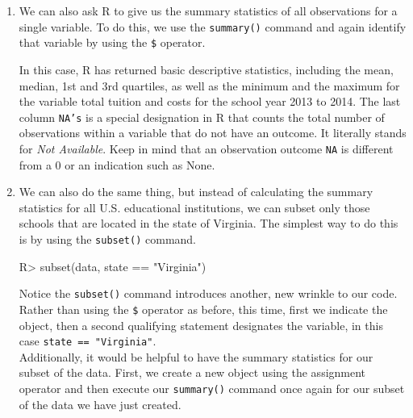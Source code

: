 \documentclass{article}
\newenvironment{Schunk}{}{}
\newcommand{\code}[1]{\texttt{#1}}
\newcommand{\proglang}[1]{\textsf{#1}}
\begin{document}
{\begin{enumerate}[leftmargin=15mm]
\item We can also ask \proglang{R} to give us the summary statistics of all observations for a single variable.  To do this, we use the \code{summary()} command and again identify that variable by using the \code{\$} operator.

\begin{Schunk}
\end{Schunk}

In this case, \proglang{R} has returned basic descriptive statistics, including the mean, median, 1st and 3rd quartiles, as well as the minimum and the maximum for the variable total tuition and costs for the school year 2013 to 2014.  The last column \code{NA's} is a special designation in \proglang{R} that counts the total number of observations within a variable that do not have an outcome.  It literally stands for \textit{Not Available}.  Keep in mind that an observation outcome \code{NA} is different from a 0 or an indication such as None.

\item We can also do the same thing, but instead of calculating the summary statistics for all U.S. educational institutions, we can subset only those schools that are located in the state of Virginia.  The simplest way to do this is by using the \code{subset()} command.

\begin{Schunk}
\begin{Sinput}

R> subset(data, state == "Virginia")
     
\end{Sinput}
\end{Schunk}

Notice the \code{subset()} command introduces another, new wrinkle to our code.  Rather than using the \code{\$} operator as before, this time, first we indicate the object, then a second qualifying statement designates the variable, in this case \code{state == "Virginia"}. \\

Additionally, it would be helpful to have the summary statistics for our subset of the data.  First, we create a new object using the assignment operator and then execute our \code{summary()} command once again for our subset of the data we have just created.


\end{enumerate}}
\end{document}
